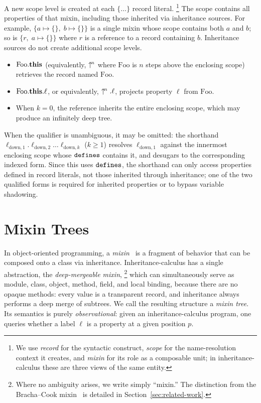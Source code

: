 A new scope level is created at each $\{\ldots\}$ record literal.%
\footnote{
  We use \emph{record} for the syntactic construct, \emph{scope}
  for the name-resolution context it creates, and \emph{mixin} for its
  role as a composable unit; in inheritance-calculus these are three views
  of the same entity.
}
The scope contains all properties of that mixin, including those
inherited via inheritance sources.
For example, $\{a \mapsto \{\},\; b \mapsto \{\}\}$ is a single mixin whose scope
contains both $a$ and $b$; so is $\{r,\; a \mapsto \{\}\}$ where $r$
is a reference to a record containing $b$.
Inheritance sources do not create additional scope levels.

\begin{itemize}
  \item $\mathrm{Foo}.\mathbf{this}$ (equivalently, $\uparrow^{\!n}$ where
    $\mathrm{Foo}$ is $n$ steps above the enclosing scope)
    retrieves the record named $\mathrm{Foo}$.
  \item $\mathrm{Foo}.\mathbf{this}.\ell$, or equivalently, $\uparrow^{\!n}.\ell$,
    projects property $\ell$ from $\mathrm{Foo}$.
  \item When $k = 0$, the reference inherits the entire
    enclosing scope, which may produce an infinitely deep tree.
\end{itemize}

When the qualifier is unambiguous, it may be omitted:
the shorthand
$\ell_{\mathrm{down},1}.\ell_{\mathrm{down},2}\ldots\ell_{\mathrm{down},k}$ ($k \ge 1$)
resolves $\ell_{\mathrm{down},1}$ against the innermost enclosing
scope whose $\mathtt{defines}$ contains it,
and desugars to the corresponding indexed form.
Since this uses $\mathtt{defines}$, the shorthand can only access
properties defined in record literals, not those inherited through
inheritance; one of the two qualified forms is required for
inherited properties or to bypass variable shadowing.

\section{Mixin Trees}
\label{sec:mixin-trees}

In object-oriented programming, a
\emph{mixin}~\cite{bracha1990-mixin-inheritance} is a fragment of behavior
that can be composed onto a class via inheritance.
Inheritance-calculus has a single abstraction, the
\emph{deep-mergeable mixin},%
\footnote{
  Where no ambiguity arises, we write simply ``mixin.''
  The distinction from the Bracha--Cook
  mixin~\cite{bracha1990-mixin-inheritance} is detailed in
  Section~\ref{sec:related-work}.
}
which can simultaneously serve as module, class, object, method, field, and
local binding, because there are no opaque methods: every value is
a transparent record, and inheritance always performs a deep
merge of subtrees.
We call the resulting structure a \emph{mixin tree}.
Its semantics is purely \emph{observational}: given an
inheritance-calculus program, one queries whether a
label $\ell$ is a property at a given position $p$.

